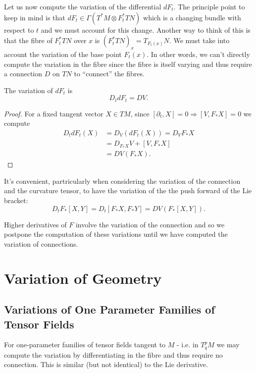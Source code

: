 Let us now compute the variation of the differential \(dF_t\). The principle point to keep in mind is that \(dF_t \in \Gamma(T^{\ast} M \otimes F_t^{\ast} TN)\) which is a changing bundle with respect to \(t\) and we must account for this change. Another way to think of this is that the fibre of \(F_t^{\ast} TN\) over \(x\) is \((F_t^{\ast} TN)_x = T_{F_t(x)} N\). We must take into account the variation of the base point \(F_t(x)\). In other words, we can't directly compute the variation in the fibre since the fibre is itself varying and thus require a connection \(D\) on \(TN\) to ``connect'' the fibres.

\begin{prop}
The variation of \(dF_t\) is
\[
D_t dF_t = DV.
\]
\end{prop}

\begin{proof}
For a fixed tangent vector \(X \in TM\), since \([\partial_t, X] = 0 \Rightarrow [V, F_{\ast} X] = 0\) we compute
\[
\begin{split}
D_t dF_t (X) &= D_V (dF_t (X)) = D_V F_{\ast} X \\
&= D_{F_{\ast} X} V + [V, F_{\ast} X] \\
&= DV (F_{\ast} X).
\end{split}
\]
\end{proof}

\begin{rem}
It's convenient, partricularly when considering the variation of the connection and the curvature tensor, to have the variation of the the push forward of the Lie bracket:
\[
D_t F_{\ast} [X, Y] = D_t [F_{\ast} X, F_{\ast} Y] = DV(F_{\ast} [X, Y]).
\]
\end{rem}

Higher derivatives of \(F\) involve the variation of the connection and so we postpone the computation of these variations until we have computed the variation of connections.

\section{Variation of Geometry}

\subsection*{Variations of One Parameter Families of Tensor Fields}

For one-parameter families of tensor fields tangent to \(M\) - i.e. in \(T^p_q M\) we may compute the variation by differentiating in the fibre and thus require no connection. This is similar (but not identical) to the Lie derivative.

